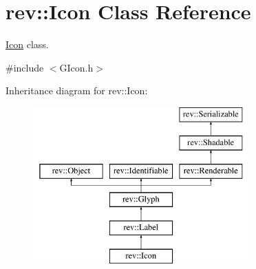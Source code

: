 \hypertarget{classrev_1_1_icon}{}\section{rev\+::Icon Class Reference}
\label{classrev_1_1_icon}


\mbox{\hyperlink{classrev_1_1_icon}{Icon}} class.  




{\ttfamily \#include $<$G\+Icon.\+h$>$}

Inheritance diagram for rev\+::Icon\+:\begin{figure}[H]
\begin{center}
\leavevmode
\includegraphics[height=6.000000cm]{classrev_1_1_icon}
\end{center}
\end{figure}

